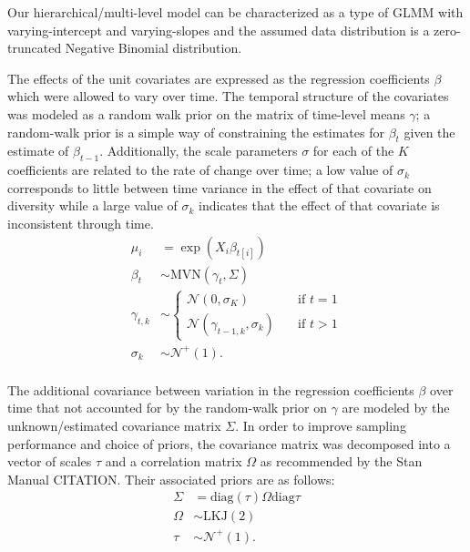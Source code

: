 \documentclass[12pt,letterpaper]{article}
\begin{document}
Our hierarchical/multi-level model can be characterized as a type of GLMM with varying-intercept and varying-slopes and the assumed data distribution is a zero-truncated Negative Binomial distribution.

The effects of the unit covariates are expressed as the regression coefficients \(\beta\) which were allowed to vary over time. The temporal structure of the covariates was modeled as a random walk prior on the matrix of time-level means \(\gamma\); a random-walk prior is a simple way of constraining the estimates for \(\beta_{t}\) given the estimate of \(\beta_{t - 1}\). Additionally, the scale parameters \(\sigma\) for each of the \(K\) coefficients are related to the rate of change over time; a low value of \(\sigma_{k}\) corresponds to little between time variance in the effect of that covariate on diversity while a large value of \(\sigma_{k}\) indicates that the effect of that covariate is inconsistent through time.
\begin{equation}
  \begin{aligned}
    \mu_{i} &= \exp(X_{i} \beta_{t[i]}) \\
    \beta_{t} &\sim \text{MVN}(\gamma_{t}, \Sigma) \\
    \gamma_{t, k} &\sim 
      \begin{cases}
        \mathcal{N}(0, \sigma_{K}) & \quad \text{if } t = 1 \\
        \mathcal{N}(\gamma_{t - 1, k}, \sigma_{k}) & \quad \text{if } t > 1
      \end{cases} \\
    \sigma_{k} &\sim \mathcal{N}^{+}(1). \\ 
  \end{aligned}
\end{equation}

The additional covariance between variation in the regression coefficients \(\beta\) over time that not accounted for by the random-walk prior on \(\gamma\) are modeled by the unknown/estimated covariance matrix \(\Sigma\). In order to improve sampling performance and choice of priors, the covariance matrix was decomposed into a vector of scales \(\tau\) and a correlation matrix \(\Omega\) as recommended by the Stan Manual CITATION. Their associated priors are as follows:
\begin{equation}
  \begin{aligned}
    \Sigma &= \text{diag}(\tau) \Omega \text{diag}{\tau} \\
    \Omega &\sim \text{LKJ}(2) \\
    \tau &\sim \mathcal{N}^{+}(1). \\
  \end{aligned}
\end{equation}
\end{document}
